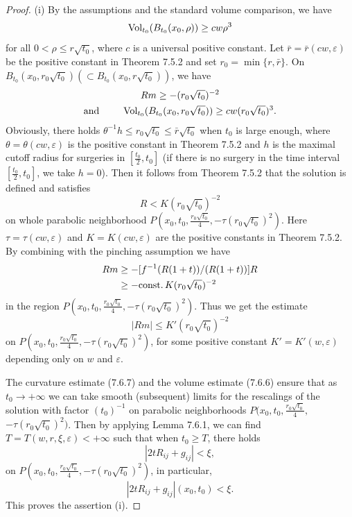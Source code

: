 \begin{proof}
(i) By the assumptions and the standard volume comparison, we have
$$
\operatorname{Vol}_{t_0}(B_{t_0}(x_0,\rho))\geq  cw \rho^3
$$
for all $0<\rho\leq r\sqrt{t_0}$, where $c$ is a universal
positive constant. Let $\bar{r}=\bar{r}(cw,\varepsilon)$ be the
positive constant in Theorem 7.5.2 and set
$r_0=\min\{r,\bar{r}\}$. On $B_{t_0}(x_0,r_0\sqrt{t_0})(\subset
B_{t_0}(x_0,r\sqrt{t_0}))$, we have
\begin{gather}
Rm\geq -(r_0\sqrt{t_0})^{-2} \\
\mbox{and }\qquad \operatorname{Vol}_{t_0}(B_{t_0}(x_0,r_0\sqrt{t_0}))\geq
cw(r_0\sqrt{t_0})^3.\nonumber
\end{gather}
Obviously, there holds $\theta^{-1}h\leq r_0\sqrt{t_0}\leq
\bar{r}\sqrt{t_0}$ when $t_0$ is large enough, where
$\theta=\theta(cw,\varepsilon)$ is the positive constant in
Theorem 7.5.2 and $h$ is the maximal cutoff radius for surgeries
in $[\frac{t_0}{2},t_0]$ (if there is no surgery in the time
interval $[\frac{t_0}{2},t_0]$, we take $h=0$). Then it follows
from Theorem 7.5.2 that the solution is defined and satisfies
$$
R<K(r_0\sqrt{t_0})^{-2}
$$
on whole parabolic neighborhood
$P(x_0,t_0,\frac{r_0\sqrt{t_0}}{4},-\tau(r_0\sqrt{t_0})^2)$. Here
$\tau=\tau(cw,\varepsilon)$ and $K=K(cw,\varepsilon)$ are the
positive constants in Theorem 7.5.2. By combining with the
pinching assumption we have
\begin{align*}
Rm&  \geq-[f^{-1}(R(1+t))/(R(1+t))]R\\
&  \geq -{\rm const.}\,K(r_0\sqrt{t_0})^{-2}
\end{align*}
in the region $P(x_0,t_0, \frac{r_0\sqrt{t_0}}{4},
-\tau(r_0\sqrt{t_0})^2)$. Thus we get the estimate \begin{equation}
|Rm|\leq K'(r_0\sqrt{t_0})^{-2} %
\end{equation} on
$P(x_0,t_0,\frac{r_0\sqrt{t_0}}{4},-\tau(r_0\sqrt{t_0})^2)$, for
some positive constant $K'=K'(w,\varepsilon)$ depending only on
$w$ and $\varepsilon$.

The curvature estimate (7.6.7) and the volume estimate (7.6.6)
ensure that as $t_0\rightarrow+\infty$ we can take smooth
(subsequent) limits for the rescalings of the solution with factor
$(t_0)^{-1}$ on parabolic neighborhoods
$P(x_0,t_0,\frac{r_0\sqrt{t_0}}{4},$ $-\tau(r_0\sqrt{t_0})^2)$.
Then by applying Lemma 7.6.1, we can find
$T=T(w,r,\xi,\varepsilon)<+\infty$ such that when $t_0\geq T$,
there holds \begin{equation}
|2tR_{ij}+g_{ij}|<\xi, %
\end{equation} on
$P(x_0,t_0,\frac{r_0\sqrt{t_0}}{4},-\tau(r_0\sqrt{t_0})^2)$, in
particular,
$$
|2tR_{ij}+g_{ij}|(x_0,t_0)<\xi.
$$
This proves the assertion (i).


\end{proof}

